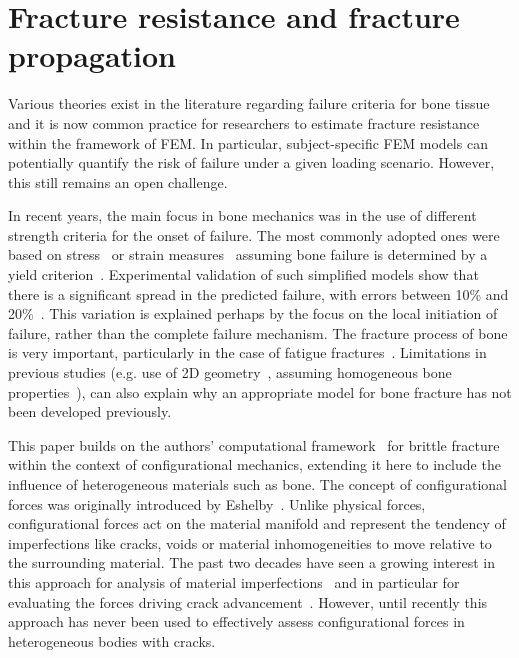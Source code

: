 \documentclass[twocolumn]{svjour3}
\begin{document}
\section{Fracture resistance and fracture propagation}
\label{sec:fracture}
Various theories exist in the literature regarding failure criteria for bone tissue and it is now common practice for researchers to estimate fracture resistance within the framework of FEM. In particular, subject-specific FEM models can potentially quantify the risk of failure under a given loading scenario. However, this still remains an open challenge.

In recent years, the main focus in bone mechanics was in the use of different strength criteria for the onset of failure. 
The most commonly adopted ones were based on stress~\cite{keyak2005predicting} or strain measures~\cite{schileo2008subject} assuming bone failure is determined by a yield criterion~\cite{yosibash2010predicting}. 
Experimental validation of such simplified models show that there is a significant spread in the predicted failure, with errors between 10\% and 20\%~\cite{van2014accurately}.
This variation is explained perhaps by the focus on the local initiation of failure, rather than the complete failure mechanism. 
The fracture process of bone is very important,  particularly in the case of fatigue fractures~\cite{gupta2008fracture}. 
Limitations in previous studies (e.g. use of 2D geometry~\cite{bettamer2017using}, assuming homogeneous bone properties~\cite{gasser2007numerical}), 
can also explain why an appropriate model for bone fracture has not been developed previously.

This paper builds on the authors' computational framework~\cite{kaczmarczyk2017energy} for brittle fracture within the context of configurational mechanics, extending it here to include the influence of heterogeneous materials such as bone.
The concept of configurational forces was originally introduced by Eshelby~\cite{eshelby1951force}. 
Unlike physical forces, configurational forces act on the material manifold and represent the tendency of imperfections like cracks, voids or material inhomogeneities to move relative to the surrounding material. 
The past two decades have seen a growing interest in this approach for analysis of material imperfections~\cite{maugin2016configurational} and in particular for evaluating the forces driving crack advancement~\cite{kaczmarczyk2017energy,steinmann2001application, ozencc2016configurational}. 
However, until recently this approach has never been used to effectively assess configurational forces in heterogeneous bodies with cracks. 
\end{document}
